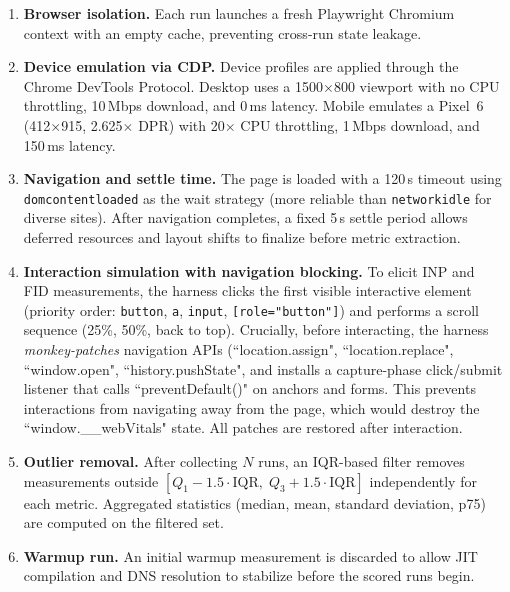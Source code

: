 \begin{enumerate}
    \item \textbf{Browser isolation.} Each run launches a fresh Playwright Chromium context with an empty cache, preventing cross-run state leakage.

    \item \textbf{Device emulation via CDP.} Device profiles are applied through the Chrome DevTools Protocol. Desktop uses a 1500$\times$800 viewport with no CPU throttling, 10\,Mbps download, and 0\,ms latency. Mobile emulates a Pixel~6 (412$\times$915, 2.625$\times$ DPR) with 20$\times$ CPU throttling, 1\,Mbps download, and 150\,ms latency.

    \item \textbf{Navigation and settle time.} The page is loaded with a 120\,s timeout using \texttt{domcontentloaded} as the wait strategy (more reliable than \texttt{networkidle} for diverse sites). After navigation completes, a fixed 5\,s settle period allows deferred resources and layout shifts to finalize before metric extraction.

    \item \textbf{Interaction simulation with navigation blocking.} To elicit INP and FID measurements, the harness clicks the first visible interactive element (priority order: \texttt{button}, \texttt{a}, \texttt{input}, \texttt{[role="button"]}) and performs a scroll sequence (25\%, 50\%, back to top). Crucially, before interacting, the harness \emph{monkey-patches} navigation APIs (``location.assign", ``location.replace", ``window.open", ``history.pushState", and installs a capture-phase click/submit listener that calls ``preventDefault()" on anchors and forms. This prevents interactions from navigating away from the page, which would destroy the ``window.\_\_webVitals" state. All patches are restored after interaction.

    \item \textbf{Outlier removal.} After collecting $N$ runs, an IQR-based filter removes measurements outside $[Q_1 - 1.5 \cdot \text{IQR},\; Q_3 + 1.5 \cdot \text{IQR}]$ independently for each metric. Aggregated statistics (median, mean, standard deviation, p75) are computed on the filtered set.

    \item \textbf{Warmup run.} An initial warmup measurement is discarded to allow JIT compilation and DNS resolution to stabilize before the scored runs begin.
\end{enumerate}

